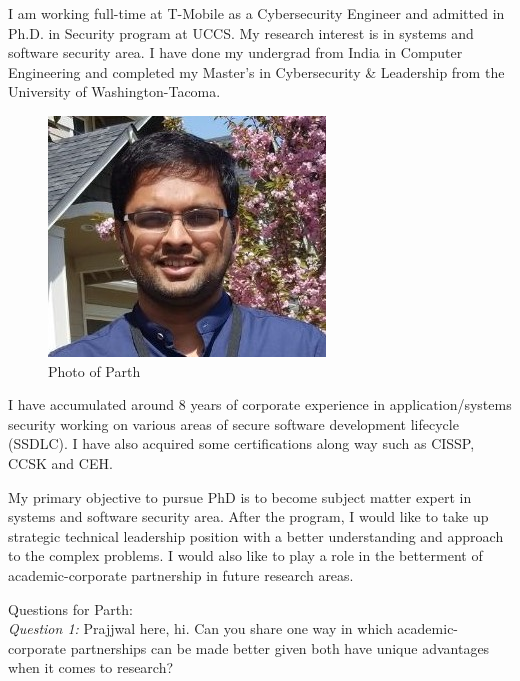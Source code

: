 I am working full-time at T-Mobile as a Cybersecurity Engineer and admitted in Ph.D. in Security program at UCCS. 
My research interest is in systems and software security area. 
I have done my undergrad from India in Computer Engineering and completed my Master’s in Cybersecurity \& Leadership from the University of Washington-Tacoma. 
\begin{figure}[h!]
\centering
\includegraphics[scale=0.5]{parth_shah.jpg}
\caption{Photo of Parth}
\label{fig:profile}
\end{figure}
I have accumulated around 8 years of corporate experience in application/systems security working on various areas of secure software development lifecycle (SSDLC). 
I have also acquired some certifications along way such as CISSP, CCSK and CEH.  


My primary objective to pursue PhD is to become subject matter expert in systems and software security area. 
After the program, I would like to take up strategic technical leadership position with a better understanding and approach to the complex problems. 
I would also like to play a role in the betterment of academic-corporate partnership in future research areas.

Questions for Parth:\\
\textit{Question 1: }Prajjwal here, hi. Can you share one way in which academic-corporate partnerships can be made better given both have unique advantages when it comes to research?
